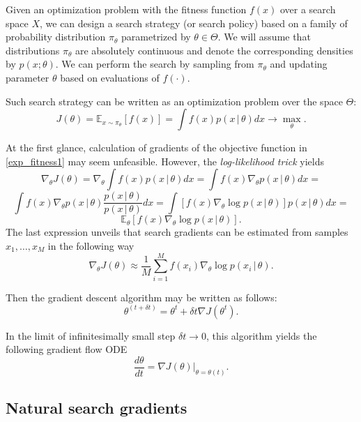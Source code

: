 \documentclass{article}
\theoremstyle{plain}%
\theoremstyle{definition}
\theoremstyle{remark}
\theoremstyle{prop}
\begin{document}
Given an optimization problem with the fitness function $f(x)$ over a search space $X$, we can design a search strategy (or search policy) based on a family of probability distribution $\pi_\theta$ parametrized by $\theta \in \Theta$. We will assume that distributions $\pi_\theta$ are absolutely continuous and denote the corresponding densities by $p(x;\theta)$. We can perform the search by sampling from $\pi_\theta$ and updating parameter $\theta$ based on evaluations of $f(\cdot)$.
 
Such search strategy can be written as an optimization problem over the space $\Theta$: 
\begin{equation}
\label{exp_fitness1}
J(\theta) = {\mathbb E}_{x \sim \pi_\theta} [f(x)] = \int f(x) p(x \, | \, \theta) dx \to \max_{\theta}.
\end{equation}  

At the first glance, calculation of gradients of the objective function in \eqref{exp_fitness1} may seem unfeasible. However, the {\it log-likelihood trick} yields
$$
\nabla_\theta J(\theta) = \nabla_\theta \int f(x) p(x \, | \, \theta) dx = \int f(x) \nabla_\theta p(x \, | \, \theta) dx = 
$$
$$
\int f(x) \nabla_\theta p(x \, | \, \theta) \frac{p(x\, | \, \theta)}{p(x \, | \, \theta)} dx =
 \int [f(x) \nabla_\theta \log p(x \, | \, \theta)] p(x\, | \, \theta) dx = 
$$
$$ 
 {\mathbb E}_\theta [f(x) \nabla_\theta \log p(x \, | \, \theta)].
$$
The last expression unveils that search gradients can be estimated from samples $x_1,\dots,x_M$ in the following way
\begin{equation}
\label{grad_est}
\nabla_\theta J(\theta) \approx \frac{1}{M} \sum_{i=1}^M f(x_i) \nabla_\theta \log p(x_i \, | \, \theta).
\end{equation}

Then the gradient descent algorithm may be written as follows:
\begin{equation}
\label{gradient_ascent}
\theta^{(t+\delta t)} = \theta^t + \delta t \nabla J(\theta^t).
\end{equation}

In the limit of infinitesimally small step $\delta t \to 0$, this algorithm yields the following gradient flow ODE
\begin{equation}
\label{gradientODE}
\frac{d \theta}{dt} = \nabla J(\theta) \bigg|_{\theta = \theta(t)}.
\end{equation}

\subsection{Natural search gradients}
\end{document}
